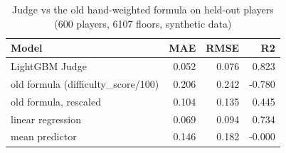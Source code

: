 \begin{table}[ht]
\centering
\small
\begin{tabular}{lrrr}
\toprule
Model & MAE & RMSE & R2 \\
\midrule
LightGBM Judge & 0.052 & 0.076 & 0.823 \\
old formula (difficulty\_score/100) & 0.206 & 0.242 & -0.780 \\
old formula, rescaled & 0.104 & 0.135 & 0.445 \\
linear regression & 0.069 & 0.094 & 0.734 \\
mean predictor & 0.146 & 0.182 & -0.000 \\
\bottomrule
\end{tabular}
\caption{Judge vs the old hand-weighted formula on held-out players (600 players, 6107 floors, synthetic data)}
\label{tab:judge_vs_formula}
\end{table}

